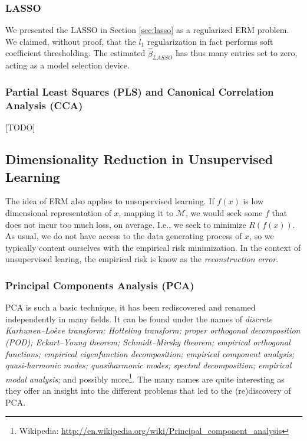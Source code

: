 \documentclass[12pt,a4paper]{article}
\theoremstyle{plain}
\theoremstyle{definition}
\newcommand{\risk}{R}
\newcommand{\hyp}{f}
\newcommand{\manifold}{\mathcal{M}}
\begin{document}
\subsubsection{LASSO}
We presented the LASSO in Section \ref{sec:lasso} as a regularized ERM problem.
We claimed, without proof, that the $l_1$ regularization in fact performs soft coefficient thresholding. The estimated $\hat{\beta}_{LASSO}$ has thus many entries set to zero, acting as a model selection device. 



\subsubsection{Partial Least Squares (PLS) and Canonical Correlation Analysis (CCA)}
\label{sec:pls}
\label{sec:cca}
[TODO]




\subsection{Dimensionality Reduction in Unsupervised Learning}
\label{sec:dim_reduce_unsupervised}

The idea of ERM also applies to unsupervised learning.
If $\hyp(x)$ is low dimensional representation of $x$, mapping it to $\manifold$, we would seek some $\hyp$ that does not incur too much loss, on average. I.e., we seek to minimize $\risk(\hyp(x))$.
As usual, we do not have access to the data generating process of $x$, so we typically content ourselves with the empirical risk minimization.
In the context of unsupervised learing, the empirical risk is know as the \emph{reconstruction error}.




\subsubsection{Principal Components Analysis (PCA)}

PCA is such a basic technique, it has been rediscovered and renamed independently in many fields. 
It can be found under the names of \emph{discrete Karhunen–Loève transform; Hotteling transform; proper orthogonal decomposition (POD); Eckart–Young theorem; Schmidt–Mirsky theorem;  empirical orthogonal functions; empirical eigenfunction decomposition;  empirical component analysis;  quasi-harmonic modes; quasiharmonic modes;  spectral decomposition;  empirical modal analysis;} and possibly more\footnote{Wikipedia: \url{http://en.wikipedia.org/wiki/Principal_component_analysis} }.
The many names are quite interesting as they offer an insight into the different problems that led to the (re)discovery of PCA.
\end{document}
